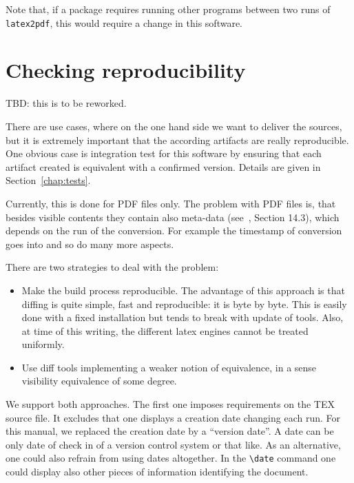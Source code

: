Note that, if a package requires running other programs 
between two runs of \texttt{latex2pdf}, 
this would require a change in this software. 

\section{Checking reproducibility}\label{sec:chkReprod}

TBD: this is to be reworked. 

There are use cases, where on the one hand side we want to deliver the sources, 
but it is extremely important that the according artifacts are really reproducible. 
One obvious case is integration test for this software 
by ensuring that each artifact created 
is equivalent with a confirmed version. 
Details are given in Section~\ref{chap:tests}. 



Currently, this is done for PDF files only. 
The problem with PDF files is, that besides visible contents 
they contain also meta-data (see~\cite{pdf17}, Section 14.3), 
which depends on the run of the conversion. 
For example the timestamp of conversion goes into and so do many more aspects. 

There are two strategies to deal with the problem: 
%
\begin{itemize}
  \item 
  Make the build process reproducible. 
  The advantage of this approach is that diffing is quite simple, fast and reproducible: 
  it is byte by byte. 
  This is easily done with a fixed installation but tends to break with update of tools. 
  Also, at time of this writing, the different latex engines cannot be treated uniformly. 
  \item 
  Use diff tools implementing a weaker notion of equivalence, 
  in a sense visibility equivalence of some degree. 
\end{itemize}

We support both approaches. 
The first one imposes requirements on the TEX source file. 
It excludes that one displays a creation date changing each run. 
For this manual, we replaced the creation date by a ``version date''. 
A date can be only date of check in of a version control system or that like. 
As an alternative, one could also refrain from using dates altogether. 
In the \texttt{\textbackslash date} command 
one could display also other pieces of information identifying the document. 

